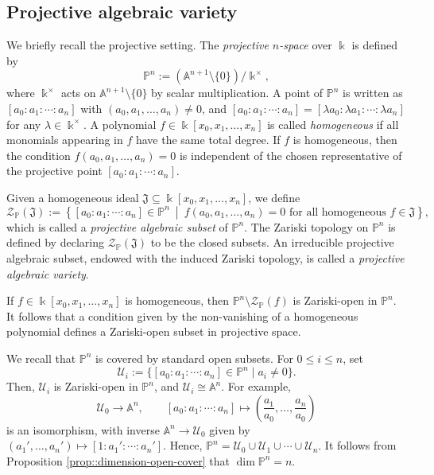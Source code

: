 \documentclass[a4,12pt]{amsart}
\numberwithin{equation}{section} %
\theoremstyle{definition} %
\begin{document}
\subsection{Projective algebraic variety}
We briefly recall the projective setting. The \emph{projective $n$-space} over $\Bbbk$ is defined by
\[
\mathbb{P}^n:=(\mathbb{A}^{n+1}\setminus\{0\})/\Bbbk^{\times},
\]
where $\Bbbk^{\times}$ acts on $\mathbb{A}^{n+1}\setminus\{0\}$ by scalar multiplication. A point of $\mathbb{P}^n$ is written as $[a_0:a_1:\cdots:a_n]$ with $(a_0,a_1,\ldots,a_n)\neq0$, and $[a_0:a_1:\cdots:a_n] = [\lambda a_0:\lambda a_1:\cdots:\lambda a_n]$ 
for any $\lambda\in\Bbbk^{\times}$. A polynomial $f\in \Bbbk[x_0,x_1,\ldots,x_n]$ is called \emph{homogeneous} if all monomials appearing in $f$ have the same total degree. If $f$ is homogeneous, then the condition $f(a_0,a_1,\ldots,a_n)=0$ is independent of the chosen representative of the projective point $[a_0:a_1:\cdots:a_n]$.

Given a homogeneous ideal $\mathfrak{J}\subseteq \Bbbk[x_0,x_1,\ldots,x_n]$, we define
\[
\mathcal{Z}_{\mathbb{P}}(\mathfrak{J})
:=
\left\{
[a_0:a_1:\cdots:a_n]\in\mathbb{P}^n
\ \middle|\
f(a_0,a_1,\ldots,a_n)=0 \text{ for all homogeneous } f\in \mathfrak{J}
\right\},
\]
which is called a \emph{projective algebraic subset} of $\mathbb{P}^n$. The Zariski topology on $\mathbb{P}^n$ is defined by declaring $\mathcal{Z}_{\mathbb{P}}(\mathfrak{J})$ to be the closed subsets. An irreducible projective algebraic subset, endowed with the induced Zariski topology, is called a \emph{projective algebraic variety}.

If $f\in\Bbbk[x_0,x_1,\ldots,x_n]$ is homogeneous, then $\mathbb{P}^n\setminus \mathcal{Z}_{\mathbb{P}}(f)$ is Zariski-open in $\mathbb{P}^n$. It follows that a condition given by the non-vanishing of a homogeneous polynomial defines a Zariski-open subset in projective space.

We recall that $\mathbb{P}^n$ is covered by standard open subsets. For $0\leq i\leq n$, set
\[
\mathcal{U}_i:=\{[a_0:a_1:\cdots:a_n]\in\mathbb{P}^n\mid a_i\neq0\}.
\]
Then, $\mathcal{U}_i$ is Zariski-open in $\mathbb{P}^n$, and $\mathcal{U}_i\cong\mathbb{A}^n$. For example,
\[
\mathcal{U}_0\longrightarrow\mathbb{A}^n,\qquad
[a_0:a_1:\cdots:a_n]\longmapsto
\left(\frac{a_1}{a_0},\ldots,\frac{a_n}{a_0}\right)
\]
is an isomorphism, with inverse $\mathbb{A}^n\rightarrow \mathcal{U}_0$ given by $(a_1',\ldots,a_n')\mapsto [1:a_1':\cdots:a_n']$. Hence, $\mathbb{P}^n=\mathcal{U}_0\cup \mathcal{U}_1\cup\cdots\cup \mathcal{U}_n$. It follows from Proposition \ref{prop::dimension-open-cover} that $\dim \mathbb{P}^n=n$.
\end{document}
